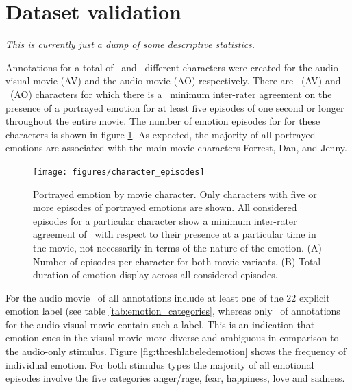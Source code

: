 \section*{Dataset validation}


\textit{This is currently just a dump of some descriptive statistics.}

Annotations for a total of \AVTotalCharLabels\ and \AOTotalCharLabels\
different characters were created for the audio-visual movie (AV) and the audio
movie (AO) respectively. There are \AVThreshCharLabels~(AV) and
\AOThreshCharLabels~(AO) characters for which there is a \AVAggThresh\ minimum
inter-rater agreement on the presence of a portrayed emotion for at least five
episodes of one second or longer throughout the entire movie. The number of
emotion episodes for for these characters is shown in figure \ref{fig:threshchar}.
As expected, the majority of all portrayed emotions are associated with the main
movie characters Forrest, Dan, and Jenny.

\begin{figure}
  \centering
  \texttt{[image: figures/character\_episodes]}
  \caption{Portrayed emotion by movie character. Only characters with five or
    more episodes of portrayed emotions are shown. All considered episodes for a particular character
    show a minimum inter-rater agreement of \AVAggThresh\ with respect to their
    presence at a particular time in the movie, not necessarily in terms of the
    nature of the emotion. (A) Number of episodes
    per character for both movie variants. (B) Total duration of emotion display
    across all considered episodes.}
  \label{fig:threshchar}
\end{figure}

For the audio movie \AOFracWithLabeledEmotions\ of all annotations include at
least one of the 22 explicit emotion label (see table
\ref{tab:emotion_categories}, whereas only \AVFracWithLabeledEmotions\ of
annotations for the audio-visual movie contain such a label. This is an
indication that emotion cues in the visual movie more diverse and ambiguous in
comparison to the audio-only stimulus. Figure \ref{fig:threshlabeledemotion}
shows the frequency of individual emotion. For both stimulus types the majority
of all emotional episodes involve the five categories anger/rage, fear,
happiness, love and sadness.

